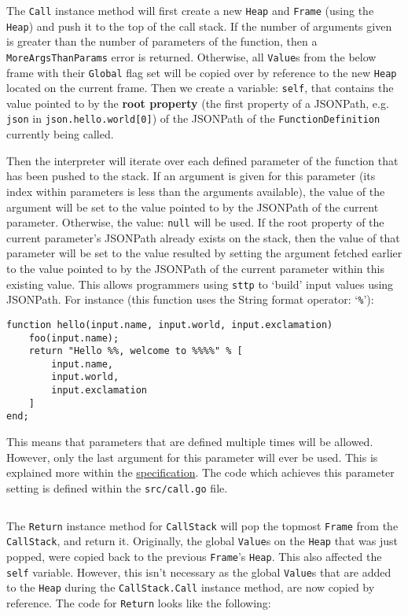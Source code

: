 The \verb|Call| instance method will first create a new \verb|Heap| and \verb|Frame| (using the \verb|Heap|) and push it to the top of the call stack. If the number of arguments given is greater than the number of parameters of the function, then a \verb|MoreArgsThanParams| error is returned. Otherwise, all \verb|Value|s from the below frame with their \verb|Global| flag set will be copied over by reference to the new \verb|Heap| located on the current frame. Then we create a variable: \verb|self|, that contains the value pointed to by the \textbf{root property} (the first property of a JSONPath, e.g. \verb|json| in \verb|json.hello.world[0]|) of the JSONPath of the \verb|FunctionDefinition| currently being called.

Then the interpreter will iterate over each defined parameter of the function that has been pushed to the stack. If an argument is given for this parameter (its index within parameters is less than the arguments available), the value of the argument will be set to the value pointed to by the JSONPath of the current parameter. Otherwise, the value: \verb|null| will be used. If the root property of the current parameter's JSONPath already exists on the stack, then the value of that parameter will be set to the value resulted by setting the argument fetched earlier to the value pointed to by the JSONPath of the current parameter within this existing value. This allows programmers using \verb|sttp| to `build' input values using JSONPath. For instance (this function uses the String format operator: `\verb|%|'):

\begin{verbatim}
function hello(input.name, input.world, input.exclamation)
    foo(input.name);
    return "Hello %%, welcome to %%%%" % [
        input.name,
        input.world,
        input.exclamation
    ]
end;
\end{verbatim}

This means that parameters that are defined multiple times will be allowed. However, only the last argument for this parameter will ever be used. This is explained more within the \hyperref[sec:function-heap]{specification}. The code which achieves this parameter setting is defined within the \verb|src/call.go| file.

\inputminted[firstline=88, lastline=130, autogobble, breaklines, tabsize=4]{go}{../../src/call.go}

The \verb|Return| instance method for \verb|CallStack| will pop the topmost \verb|Frame| from the \verb|CallStack|, and return it. Originally, the global \verb|Value|s on the \verb|Heap| that was just popped, were copied back to the previous \verb|Frame|'s \verb|Heap|. This also affected the \verb|self| variable. However, this isn't necessary as the global \verb|Value|s that are added to the \verb|Heap| during the \verb|CallStack.Call| instance method, are now copied by reference. The code for \verb|Return| looks like the following:

